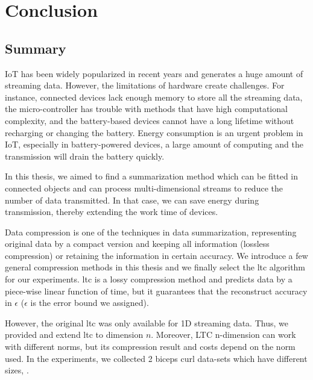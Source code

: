 \chapter{Conclusion}


\section{Summary}


IoT has been widely popularized in recent years and generates a huge amount of
streaming data. However, the limitations of hardware create challenges. For
instance, connected devices lack enough memory to store all the streaming data,
the micro-controller has trouble with methods that have high computational
complexity, and the battery-based devices cannot have a long lifetime without
recharging or changing the battery. Energy consumption is an urgent problem in
IoT, especially in battery-powered devices, a large amount of computing and the
transmission will drain the battery quickly.

In this thesis, we aimed to find a summarization method which can be fitted in
connected objects and can process multi-dimensional streams to reduce the number
of data transmitted. In that case, we can save energy during transmission,
thereby extending the work time of devices.

Data compression is one of the techniques in data summarization, representing
original data by a compact version and keeping all information (lossless
compression) or retaining the information in certain accuracy. We introduce a
few general compression methods in this thesis and we finally select the
\acrfull{ltc} algorithm for our experiments. \acrshort{ltc} is a lossy
compression method and predicts data by a piece-wise linear function of time,
but it guarantees that the reconstruct accuracy in $\epsilon$ ($\epsilon$ is the
error bound we assigned). 

However, the original \acrshort{ltc} was only available for 1D
streaming data. Thus, we provided  and extend \acrshort{ltc} to dimension $n$. Moreover, LTC
n-dimension can work with different norms, but its compression result and costs
depend on the norm used. In the experiments, we collected 2 biceps curl data-sets
which have different sizes,  .

